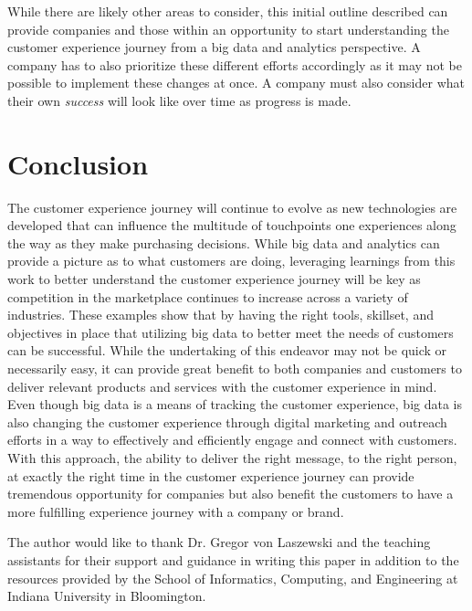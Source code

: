 \documentclass[sigconf]{acmart}
\begin{document}
While there are likely other areas to consider, this initial outline described can provide companies and those within an opportunity to start understanding the customer experience journey from a big data and analytics perspective. A company has to also prioritize these different efforts accordingly as it may not be possible to implement these changes at once. A company must also consider what their own \textit{success} will look like over time as progress is made.  

\section{Conclusion}
The customer experience journey will continue to evolve as new technologies are developed that can influence the multitude of touchpoints one experiences along the way as they make purchasing decisions. While big data and analytics can provide a picture as to what customers are doing, leveraging learnings from this work to better understand the customer experience journey will be key as competition in the marketplace continues to increase across a variety of industries. These examples show that by having the right tools, skillset, and objectives in place that utilizing big data to better meet the needs of customers can be successful. While the undertaking of this endeavor may not be quick or necessarily easy, it can provide great benefit to both companies and customers to deliver relevant products and services with the customer experience in mind.  Even though big data is a means of tracking the customer experience, big data is also changing the customer experience through digital marketing and outreach efforts in a way to effectively and efficiently engage and connect with customers. With this approach, the ability to deliver the right message, to the right person, at exactly the right time in the customer experience journey can provide tremendous opportunity for companies but also benefit the customers to have a more fulfilling experience journey with a company or brand. 

\begin{acks}

  The author would like to thank Dr. Gregor von Laszewski and the teaching assistants for their support and guidance in writing this paper in addition to the resources provided by the School of Informatics, Computing, and Engineering at Indiana University in Bloomington. 

\end{acks}



 
\end{document}
